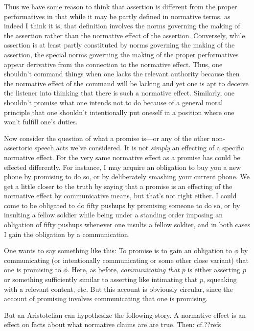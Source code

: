 Thus we have some reason to think that assertion is different from the proper performatives in that while 
it may be partly defined in normative terms, as indeed I think it is, that definition 
involves the norms governing the making of the assertion rather than the normative effect of the assertion.
Conversely, while assertion is at least partly constituted by norms governing the making of the assertion,
the special norms governing the making of the proper performatives appear derivative from the connection
to the normative effect. Thus, one shouldn't command things when one lacks the relevant authority because 
then the normative effect of the command will be lacking and yet one is apt to deceive the listener into
thinking that there is such a normative effect. Similarly, one shouldn't promise what one intends not to
do because of a general moral principle that one shouldn't intentionally put oneself in a position where 
one won't fulfill one's duties. 

Now consider the question of what a promise is---or any of the other non-assertoric speech acts we've
considered. It is not \textit{simply} an effecting of a specific normative effect. For the very same
normative effect as a promise has could be effected differently. For instance, I may acquire an obligation
to buy you a new phone by promising to do so, or by deliberately smashing your current phone. We get a 
little closer to the truth by saying that a promise is an effecting of the normative effect by communicative
means, but that's not right either. I could come to be obligated to do fifty pushups by promising someone to do so,
or by insulting a fellow soldier while being under a standing order imposing an obligation of fifty pushups whenever 
one insults a fellow soldier, and in both cases I gain the obligation by a communication.

One wants to say something like this: To promise is to gain an obligation to 
$\phi$ by communicating (or intentionally communicating or some other close variant) that one is promising 
to $\phi$. Here, as before, \textit{communicating that $p$} is either asserting $p$ or something sufficiently similar 
to asserting like intimating that $p$, squeaking with a relevant content, etc. But this account is obviously circular, since the account of promising
involves communicating that one is promising.

But an Aristotelian can hypothesize the following story. A normative effect is an effect on facts about
what normative claims are are true. Then:
cf.??refs

